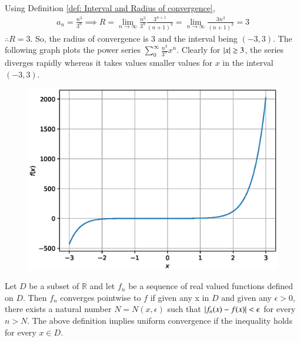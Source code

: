 \documentclass[journal,12pt,twocolumn]{IEEEtran}
\begin{document}
Using Definition \ref{def: Interval and Radius of convergence},
\begin{align}
a_n=\frac{n^3}{3^n} \implies R = \lim_{n \to \infty} \frac{n^3}{3^n} \frac{3^{n+1}}{(n+1)^3} = \lim_{n \to \infty} \frac{3n^3}{(n+1)^3}=3 
\end{align}
$\therefore R=3$. So, the radius of convergence is 3 and the interval being $(-3,3)$.
The following graph plots the power series $\sum_{0}^{\infty}\frac{n^3}{3^n} x^n$. Clearly for $\left\vert x\right\vert \ge 3$, the series diverges rapidly whereas it takes values smaller values for $x$ in the interval $(-3,3)$.


\begin{figure}[!ht]
\begin{center}
\includegraphics[width=\columnwidth]{./figs/1.eps}
\end{center}

\label{fig:1}	
\end{figure}
\begin{definition}
\label{Uniform and point-wise convergence}
Let $D$ be a subset of $\mathbb{R}$ and let {$f_n$} be a sequence of real valued functions defined on $D$. Then {$f_n$} converges pointwise to $f$ if given any x in $D$ and given any $\epsilon>0$, there exists a natural number $N=N(x,\epsilon)$ such that $\left\vert f_n(x)-f(x)\right\vert<\epsilon$ for every $n>N$.
The above definition implies uniform convergence if the inequality holds for every $x\in D$.
\end{definition}
\end{document}
